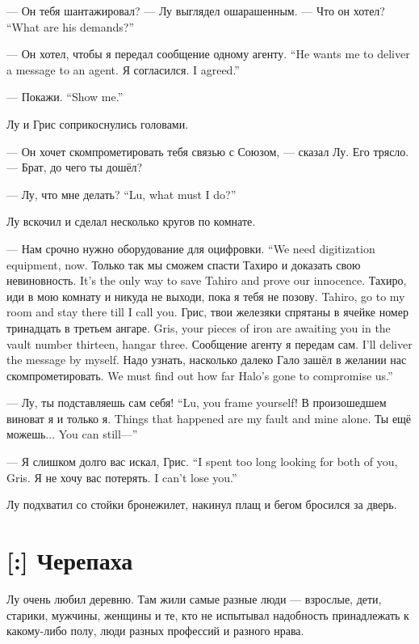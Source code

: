--- Он тебя шантажировал? --- Лу выглядел ошарашенным.
{--- Что он хотел?}
{``What are his demands?''}

{--- Он хотел, чтобы я передал сообщение одному агенту.}
{``He wants me to deliver a message to an agent.}
{Я согласился.}
{I agreed.''}

{--- Покажи.}
{``Show me.''}

Лу и Грис соприкоснулись головами.

--- Он хочет скомпрометировать тебя связью с Союзом, --- сказал Лу.
Его трясло.
--- Брат, до чего ты дошёл?

{--- Лу, что мне делать?}
{``Lu, what must I do?''}

Лу вскочил и сделал несколько кругов по комнате.

{--- Нам срочно нужно оборудование для оцифровки.}
{``We need digitization equipment, now.}
{Только так мы сможем спасти Тахиро и доказать свою невиновность.}
{It's the only way to save Tahiro and prove our innocence.}
{Тахиро, иди в мою комнату и никуда не выходи, пока я тебя не позову.}
{Tahiro, go to my room and stay there till I call you.}
{Грис, твои железяки спрятаны в ячейке номер тринадцать в третьем ангаре.}
{Gris, your pieces of iron are awaiting you in the vault number thirteen, hangar three.}
{Сообщение агенту я передам сам.}
{I'll deliver the message by myself.}
{Надо узнать, насколько далеко Гало зашёл в желании нас скомпрометировать.}
{We must find out how far Halo's gone to compromise us.''}

{--- Лу, ты подставляешь сам себя!}
{``Lu, you frame yourself!}
{В произошедшем виноват я и только я.}
{Things that happened are my fault and mine alone.}
{Ты ещё можешь...}
{You can still---''}

{--- Я слишком долго вас искал, Грис.}
{``I spent too long looking for both of you, Gris.}
{Я не хочу вас потерять.}
{I can't lose you.''}

Лу подхватил со стойки бронежилет, накинул плащ и бегом бросился за дверь.

\section{[:] Черепаха}

\textspace

Лу очень любил деревню.
Там жили самые разные люди --- взрослые, дети, старики, мужчины, женщины и те, кто не испытывал надобность принадлежать к какому-либо полу, люди разных профессий и разного нрава.

